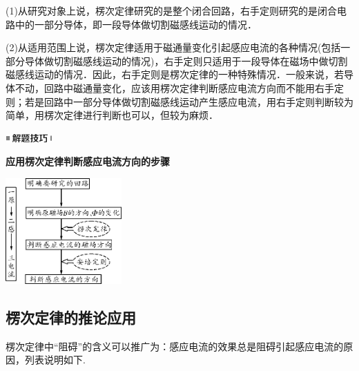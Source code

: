 \documentclass[cn,10.5pt,chinese,mac,chinesefont=founder]{elegantbook}
\begin{document}
(1)从研究对象上说，楞次定律研究的是整个闭合回路，右手定则研究的是闭合电路中的一部分导体，即一段导体做切割磁感线运动的情况．

(2)从适用范围上说，楞次定律适用于磁通量变化引起感应电流的各种情况(包括一部分导体做切割磁感线运动的情况)，右手定则只适用于一段导体在磁场中做切割磁感线运动的情况．因此，右手定则是楞次定律的一种特殊情况．一般来说，若导体不动，回路中磁通量变化，应该用楞次定律判断感应电流方向而不能用右手定则；若是回路中一部分导体做切割磁感线运动产生感应电流，用右手定则判断较为简单，用楞次定律进行判断也可以，但较为麻烦．

\begin{center}\includegraphics[width=0.70764in,height=0.12292in]{media/image37.png}\end{center}
\begin{center}
	\textbf{应用楞次定律判断感应电流方向的步骤}
\end{center}

\begin{center}\includegraphics[width=1.75486in,height=1.59444in]{media/image390.png}\end{center}

\newpage
\subsection{楞次定律的推论应用}

楞次定律中``阻碍''的含义可以推广为：感应电流的效果总是阻碍引起感应电流的原因，列表说明如下.
\end{document}
